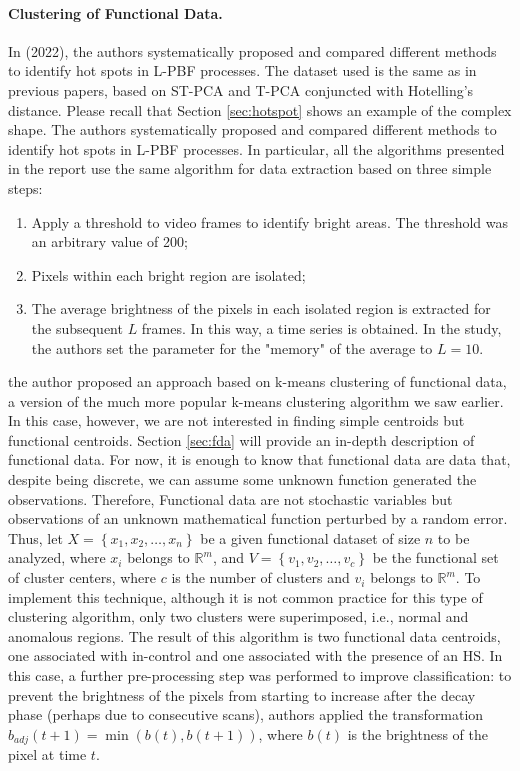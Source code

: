 \paragraph{Clustering of Functional Data.} In \citeauthor{bugatti_towards_2022} (2022), the authors systematically proposed and compared different methods to identify hot spots in L-PBF processes. The dataset used is the same as in previous papers, based on ST-PCA and T-PCA conjuncted with Hotelling's distance. Please recall that Section \ref{sec:hotspot} shows an example of the complex shape. The authors systematically proposed and compared different methods to identify hot spots in L-PBF processes. In particular, all the algorithms presented in the report use the same algorithm for data extraction based on three simple steps:
\begin{enumerate}
    \item Apply a threshold to video frames to identify bright areas. The threshold was an arbitrary value of 200;
    \item Pixels within each bright region are isolated;
    \item The average brightness of the pixels in each isolated region is extracted for the subsequent $L$ frames. In this way, a time series is obtained. In the study, the authors set the parameter for the "memory" of the average to $L=10$.
\end{enumerate} the author proposed an approach based on k-means clustering of functional data, a version of the much more popular k-means clustering algorithm we saw earlier. In this case, however, we are not interested in finding simple centroids but functional centroids. Section \ref{sec:fda} will provide an in-depth description of functional data. For now, it is enough to know that functional data are data that, despite being discrete, we can assume some unknown function generated the observations. Therefore, Functional data are not stochastic variables but observations of an unknown mathematical function perturbed by a random error. Thus, let $X=\left\{x_1, x_2, \ldots, x_n\right\}$ be a given functional dataset of size $n$ to be analyzed, where $x_i$ belongs to $\mathbb{R}^m$, and $V=\left\{v_1, v_2, \ldots, v_c\right\}$ be the functional set of cluster centers, where $c$ is the number of clusters and $v_i$ belongs to $\mathbb{R}^m$. To implement this technique, although it is not common practice for this type of clustering algorithm, only two clusters were superimposed, i.e., normal and anomalous regions. The result of this algorithm is two functional data centroids, one associated with in-control and one associated with the presence of an HS. In this case, a further pre-processing step was performed to improve classification: to prevent the brightness of the pixels from starting to increase after the decay phase (perhaps due to consecutive scans), authors applied the transformation $b_{a d j}(t+1)=\min (b(t), b(t+1))$, where $b(t)$ is the brightness of the pixel at time $t$.

